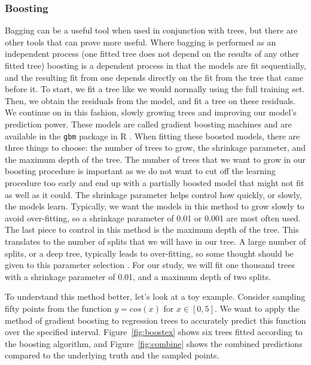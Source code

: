 \documentclass[12pt]{article}\usepackage[]{graphicx}\usepackage[]{color}
\begin{document}
\subsubsection{Boosting}
Bagging can be a useful tool when used in conjunction with trees, but there are other tools that can prove more useful. Where bagging is performed as an independent process (one fitted tree does not depend on the results of any other fitted tree) boosting is a dependent process in that the models are fit sequentially, and the resulting fit from one depends directly on the fit from the tree that came before it. To start, we fit a tree like we would normally using the full training set. Then, we obtain the residuals from the model, and fit a tree on these residuals. We continue on in this fashion, slowly growing trees and improving our model's prediction power. These models are called gradient boosting machines and are available in the \texttt{gbm} package in R \cite{gbm}. When fitting these boosted models, there are three things to choose: the number of trees to grow, the shrinkage parameter, and the maximum depth of the tree. The number of trees that we want to grow in our boosting procedure is important as we do not want to cut off the learning procedure too early and end up with a partially boosted model that might not fit as well as it could. The shrinkage parameter helps control how quickly, or slowly, the models learn. Typically, we want the models in this method to grow slowly to avoid over-fitting, so a shrinkage parameter of 0.01 or 0.001 are most often used. The last piece to control in this method is the maximum depth of the tree. This translates to the number of splits that we will have in our tree. A large number of splits, or a deep tree, typically leads to over-fitting, so some thought should be given to this parameter selection \cite{bag}. For our study, we will fit one thousand trees with a shrinkage parameter of 0.01, and a maximum depth of two splits.

To understand this method better, let's look at a toy example. Consider sampling fifty points from the function $y=cos(x)$ for $x \in [0,5]$. We want to apply the method of gradient boosting to regression trees to accurately predict this function over the specified interval. Figure~\ref{fig:boostex} shows six trees fitted according to the boosting algorithm, and Figure~\ref{fig:combine} shows the combined predictions compared to the underlying truth and the sampled points.
\end{document}
